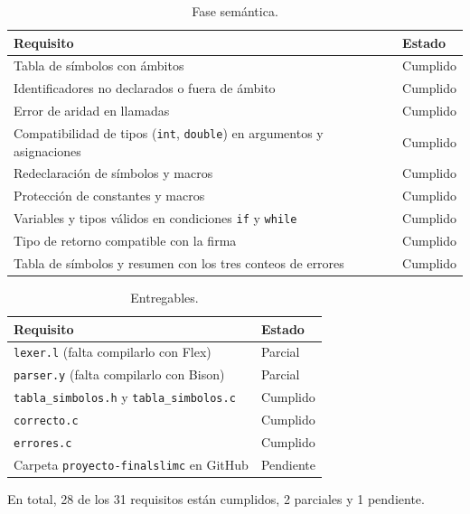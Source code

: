 \documentclass[runningheads]{llncs}
\begin{document}
\begin{table}[t]
\caption{Fase semántica.}\label{tab:sem}
\centering\footnotesize
\begin{tabular}{@{}p{85mm}l@{}}
\toprule
Requisito & Estado\\
\midrule
Tabla de símbolos con ámbitos & Cumplido\\
Identificadores no declarados o fuera de ámbito & Cumplido\\
Error de aridad en llamadas & Cumplido\\
Compatibilidad de tipos (\texttt{int}, \texttt{double}) en argumentos y asignaciones & Cumplido\\
Redeclaración de símbolos y macros & Cumplido\\
Protección de constantes y macros & Cumplido\\
Variables y tipos válidos en condiciones \texttt{if} y \texttt{while} & Cumplido\\
Tipo de retorno compatible con la firma & Cumplido\\
Tabla de símbolos y resumen con los tres conteos de errores & Cumplido\\
\bottomrule
\end{tabular}
\end{table}

\begin{table}[t]
\caption{Entregables.}\label{tab:ent}
\centering\footnotesize
\begin{tabular}{@{}p{85mm}l@{}}
\toprule
Requisito & Estado\\
\midrule
\texttt{lexer.l} (falta compilarlo con Flex) & Parcial\\
\texttt{parser.y} (falta compilarlo con Bison) & Parcial\\
\texttt{tabla\_simbolos.h} y \texttt{tabla\_simbolos.c} & Cumplido\\
\texttt{correcto.c} & Cumplido\\
\texttt{errores.c} & Cumplido\\
Carpeta \texttt{proyecto-finalslimc} en GitHub & Pendiente\\
\bottomrule
\end{tabular}
\end{table}

En total, 28 de los 31 requisitos están cumplidos, 2 parciales y 1 pendiente.
\end{document}
